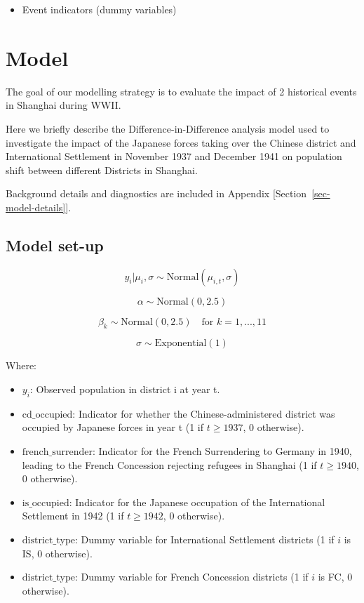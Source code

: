 \documentclass[
  letterpaper,
  DIV=11,
  numbers=noendperiod]{scrartcl}
\providecommand{\tightlist}{%
  \setlength{\itemsep}{0pt}\setlength{\parskip}{0pt}}\usepackage{longtable,booktabs,array}
\begin{document}
\begin{itemize}
\tightlist
\item
  Event indicators (dummy variables)
\end{itemize}

\begin{table}

\end{table}

\hypertarget{model}{%
\section{Model}\label{model}}

The goal of our modelling strategy is to evaluate the impact of 2
historical events in Shanghai during WWII.

Here we briefly describe the Difference-in-Difference analysis model
used to investigate the impact of the Japanese forces taking over the
Chinese district and International Settlement in November 1937 and
December 1941 on population shift between different Districts in
Shanghai.

Background details and diagnostics are included in Appendix
{[}Section~\ref{sec-model-details}{]}.

\hypertarget{model-set-up}{%
\subsection{Model set-up}\label{model-set-up}}

\[y_i|\mu_i, \sigma \sim \text{Normal}(\mu_{i,t}, \sigma)\]

\[\alpha \sim \text{Normal}(0, 2.5)\]

\[\beta_k \sim \text{Normal}(0, 2.5) \quad \text{for } k = 1, ..., 11\]

\[\sigma \sim \text{Exponential}(1)\]

Where:

\begin{itemize}
\tightlist
\item
  \(y_i\): Observed population in district i at year t.
\item
  \(\text{cd_occupied}\): Indicator for whether the Chinese-administered
  district was occupied by Japanese forces in year t (1 if
  \(t \geq 1937\), 0 otherwise).
\item
  \(\text{french_surrender}\): Indicator for the French Surrendering to
  Germany in 1940, leading to the French Concession rejecting refugees
  in Shanghai (1 if \(t \geq 1940\), 0 otherwise).
\item
  \(\text{is_occupied}\): Indicator for the Japanese occupation of the
  International Settlement in 1942 (1 if \(t \geq 1942\), 0 otherwise).
\item
  \(\text{district_type}\): Dummy variable for International Settlement
  districts (1 if \(i\) is IS, 0 otherwise).
\item
  \(\text{district_type}\): Dummy variable for French Concession
  districts (1 if \(i\) is FC, 0 otherwise).
\end{itemize}
\end{document}
